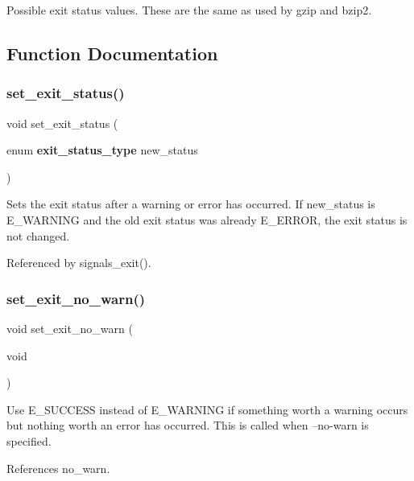 Possible exit status values. These are the same as used by gzip and bzip2. 



\subsection{Function Documentation}
\mbox{\label{main_8h_aa5da9e106c96aef50fcb212123d5e906}} 
\subsubsection{set\+\_\+exit\+\_\+status()}
{\footnotesize\ttfamily void set\+\_\+exit\+\_\+status (\begin{DoxyParamCaption}\item[{enum \textbf{ exit\+\_\+status\+\_\+type}}]{new\+\_\+status }\end{DoxyParamCaption})}

Sets the exit status after a warning or error has occurred. If new\+\_\+status is E\+\_\+\+W\+A\+R\+N\+I\+NG and the old exit status was already E\+\_\+\+E\+R\+R\+OR, the exit status is not changed. 

Referenced by signals\+\_\+exit().

\mbox{\label{main_8h_a822c7b0dcac2111d1abacbb29145458e}} 
\subsubsection{set\+\_\+exit\+\_\+no\+\_\+warn()}
{\footnotesize\ttfamily void set\+\_\+exit\+\_\+no\+\_\+warn (\begin{DoxyParamCaption}\item[{void}]{ }\end{DoxyParamCaption})}

Use E\+\_\+\+S\+U\+C\+C\+E\+SS instead of E\+\_\+\+W\+A\+R\+N\+I\+NG if something worth a warning occurs but nothing worth an error has occurred. This is called when --no-\/warn is specified. 

References no\+\_\+warn.

